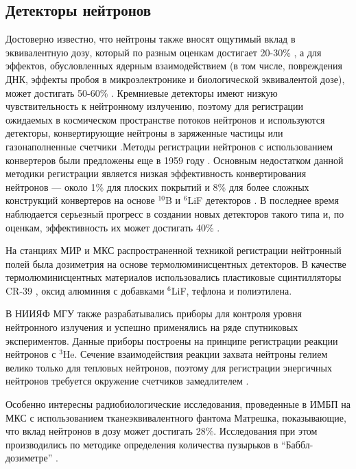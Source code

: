 \subsection{Детекторы нейтронов} \label{subsect1_3_1}


Достоверно известно, что нейтроны также вносят ощутимый вклад в эквивалентную дозу, который по разным оценкам достигает 20-30\% \cite{Dudkin1990}, а для эффектов, обусловленных ядерным взаимодействием (в том числе, повреждения ДНК, эффекты пробоя в микроэлектронике и биологической эквивалентой дозе), может достигать 50-60\% \cite{Armstrong2001} \cite{Benton2001}. Кремниевые детекторы имеют низкую чувствительность к нейтронному излучению, поэтому для регистрации ожидаемых в космическом пространстве потоков нейтронов \cite{Esteban2016} и используются детекторы, конвертирующие нейтроны в заряженные частицы или газонаполненные счетчики \cite{Stozhkov2007}.Методы регистрации нейтронов с использованием конвертеров были предложены еще в 1959 году \cite{McGregor2013}. Основным недостатком данной методики регистрации является низкая эффективность конвертирования нейтронов --- около 1\% для плоских покрытий и 8\% для более сложных конструкций конвертеров на основе $ ^{10} $B и $ ^6 $LiF детекторов \cite{Mendicino2015}. В последнее время наблюдается серьезный прогресс в создании новых детекторов такого типа и, по оценкам, эффективность их может достигать 40\% \cite{McGregor2013}. 

На станциях МИР и МКС распространенной техникой регистрации нейтронный полей была дозиметрия на основе термолюминисцентных детекторов. В качестве термолюминисцентных материалов использовались пластиковые сцинтилляторы CR-39 \cite{Alberts1991}, оксид алюминия с добавками $ ^6 $LiF, тефлона и полиэтилена\cite{Kulkarni2011}.

 В НИИЯФ МГУ также разрабатывались приборы для контроля уровня нейтронного излучения \cite{Shavrin1990} и успешно применялись на ряде спутниковых экспериментов. Данные приборы построены на принципе регистрации реакции нейтронов с $ ^{3} $He. Сечение взаимодействия реакции захвата нейтроны гелием велико только для тепловых нейтронов, поэтому для регистрации энергичных нейтронов требуется окружение счетчиков замедлителем \cite{Shavrin2002}.

Особенно интересны радиобиологические исследования, проведенные в ИМБП \cite{Shurshakov2016} на МКС с использованием тканеэквивалентного фантома Матрешка, показывающие, что вклад нейтронов в дозу может достигать 28\%.  Исследования при этом производились по методике определения количества пузырьков в ``Баббл-дозиметре'' \cite{hulapko2016}.



